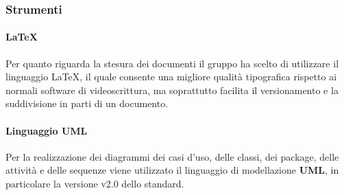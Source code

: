 \subsubsection{Strumenti}
\paragraph*{\LaTeX}
Per quanto riguarda la stesura dei documenti il gruppo ha scelto di utilizzare il linguaggio \LaTeX{}, il quale consente una migliore qualità tipografica rispetto ai normali software di videoscrittura, ma soprattutto facilita il versionamento e la suddivisione in parti di un documento.

\paragraph*{Linguaggio UML}
Per la realizzazione dei diagrammi dei casi d'uso, delle classi, dei package, delle attività e delle sequenze viene utilizzato il linguaggio di modellazione \textbf{UML}, in particolare la versione v2.0 dello standard.

